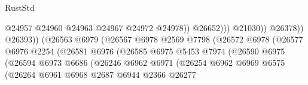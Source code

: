 \begin{lexlean}{RustStd}
\begin{coremodule}
                                                          @24957
                                                          @24960
                                                          @24963
                                                          @24967
                                                          @24972
                                                          @24978))
                                                      @26652)))
                                                @21030))
                                            @26378))
                                        @26393))
                                    (@26563
                                      @6979
                                      (@26567
                                        @6978
                                        @2569
                                        @7798
                                        (@26572
                                          @6978
                                          (@26577
                                            @6976
                                            @2254
                                            (@26581
                                              @6976
                                              (@26585
                                                @6975
                                                @5453
                                                @7974
                                                (@26590
                                                  @6975
                                                  (@26594
                                                    @6973
                                                    @6686
                                                    (@26246
                                                      @6962
                                                      @6971
                                                      (@26254
                                                        @6962
                                                        @6969
                                                        @6575
                                                        (@26264
                                                          @6961
                                                          @6968
                                                          @2687
                                                          @6944
                                                          @2366
                                                          @26277

\end{coremodule}
\end{lexlean}
